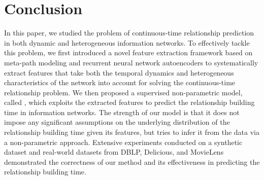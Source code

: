 \section{Conclusion}\label{sec:conclusion}
In this paper, we studied the problem of continuous-time relationship prediction in both dynamic and heterogeneous information networks. To effectively tackle this problem, we first introduced a novel feature extraction framework based on meta-path modeling and recurrent neural network autoencoders to systematically extract features that take both the temporal dynamics and heterogeneous characteristics of the network into account for solving the continuous-time relationship problem. We then proposed a supervised non-parametric model, called \npglm, which exploits the extracted features to predict the relationship building time in information networks. The strength of our model is that it does not impose any significant assumptions on the underlying distribution of the relationship building time given its features, but tries to infer it from the data via a non-parametric approach. Extensive experiments conducted on a synthetic dataset and real-world datasets from DBLP, Delicious, and MovieLens demonstrated the correctness of our method and its effectiveness in predicting the relationship building time.
